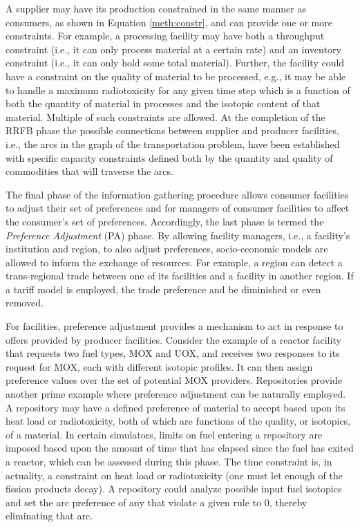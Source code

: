 A supplier may have its production constrained in the same manner as consumers,
as shown in Equation \ref{meth:constr}, and can provide one or more
constraints. For example, a processing facility may have both a throughput
constraint (i.e., it can only process material at a certain rate) and an
inventory constraint (i.e., it can only hold some total material). Further, the
facility could have a constraint on the quality of material to be processed,
e.g., it may be able to handle a maximum radiotoxicity for any given time step
which is a function of both the quantity of material in processes and the
isotopic content of that material. Multiple of such constraints are allowed. At
the completion of the RRFB phase the possible connections between supplier and
producer facilities, i.e., the arcs in the graph of the transportation problem,
have been established with specific capacity constraints defined both by the
quantity and quality of commodities that will traverse the arcs.

The final phase of the information gathering procedure allows consumer
facilities to adjust their set of preferences and for managers of consumer
facilities to affect the consumer's set of preferences. Accordingly, the last
phase is termed the \textit{Preference Adjustment} (PA) phase. By allowing
facility managers, i.e., a facility's institution and region, to also adjust
preferences, socio-economic models are allowed to inform the exchange of
resources. For example, a region can detect a trans-regional trade between one of
its facilities and a facility in another region. If a tariff model is employed,
the trade preference and be diminished or even removed.

For facilities, preference adjustment provides a mechanism to act in response to
offers provided by producer facilities. Consider the example of a reactor
facility that requests two fuel types, MOX and UOX, and receives two responses
to its request for MOX, each with different isotopic profiles. It can then
assign preference values over the set of potential MOX providers. Repositories
provide another prime example where preference adjustment can be naturally
employed. A repository may have a defined preference of material to accept based
upon its heat load or radiotoxicity, both of which are functions of the quality,
or isotopics, of a material. In certain simulators, limits on fuel entering a
repository are imposed based upon the amount of time that has elapsed since the
fuel has exited a reactor, which can be assessed during this phase. The time
constraint is, in actuality, a constraint on heat load or radiotoxicity (one
must let enough of the fission products decay). A repository could analyze
possible input fuel isotopics and set the arc preference of any that violate a
given rule to 0, thereby eliminating that arc.

